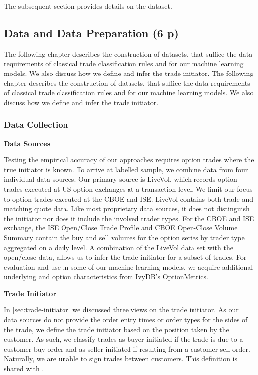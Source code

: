 The subsequent section provides details on the dataset.

\subsection{Data and Data Preparation (6 p)}\label{sec:data-and-data-preparation}

The following chapter describes the construction of datasets, that suffice the data requirements of classical trade classification rules and for our machine learning models. We also discuss how we define and infer the trade initiator.
The following chapter describes the construction of datasets, that suffice the data requirements of classical trade classification rules and for our machine learning models. We also discuss how we define and infer the trade initiator.

\subsubsection{Data Collection}\label{sec:data-collection}

\textbf{Data Sources}

Testing the empirical accuracy of our approaches requires option trades where the true initiator is known. To arrive at labelled sample, we combine data from four individual data sources. Our primary source is LiveVol, which records option trades executed at US option exchanges at a transaction level. We limit our focus to option trades executed at the \gls{CBOE} and \gls{ISE}. LiveVol contains both trade and matching quote data. Like most proprietary data sources, it does not distinguish the initiator nor does it include the involved trader types. For the \gls{CBOE} and \gls{ISE} exchange, the \gls{ISE} Open/Close Trade Profile and \gls{CBOE} Open-Close Volume Summary contain the buy and sell volumes for the option series by trader type aggregated on a daily level. A combination of the LiveVol data set with the open/close data, allows us to infer the trade initiator for a subset of trades. For evaluation and use in some of our machine learning models, we acquire additional underlying and option characteristics from IvyDB's OptionMetrics.

\textbf{Trade Initiator}

In \cref{sec:trade-initiator} we discussed three views on the trade initiator. As our data sources do not provide the order entry times or order types for the sides of the trade, we define the trade initiator based on the position taken by the customer. As such, we classify trades as buyer-initiated if the trade is due to a customer buy order and as seller-initiated if resulting from a customer sell order. Naturally, we are unable to sign trades between customers. This definition is shared with \textcite[][8]{grauerOptionTradeClassification2022}.

